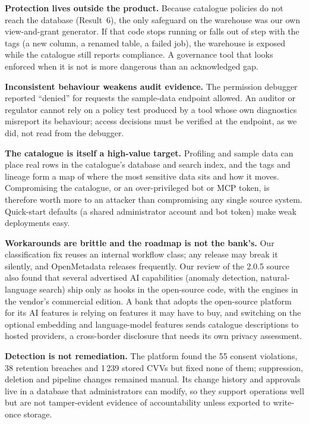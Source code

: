 \documentclass[journal,onecolumn,11pt]{IEEEtran}
\begin{document}
\textbf{Protection lives outside the product.} Because catalogue policies do not reach the database (Result~6), the only safeguard on the warehouse was our own view-and-grant generator. If that code stops running or falls out of step with the tags (a new column, a renamed table, a failed job), the warehouse is exposed while the catalogue still reports compliance. A governance tool that looks enforced when it is not is more dangerous than an acknowledged gap.

\textbf{Inconsistent behaviour weakens audit evidence.} The permission debugger reported ``denied'' for requests the sample-data endpoint allowed. An auditor or regulator cannot rely on a policy test produced by a tool whose own diagnostics misreport its behaviour; access decisions must be verified at the endpoint, as we did, not read from the debugger.

\textbf{The catalogue is itself a high-value target.} Profiling and sample data can place real rows in the catalogue's database and search index, and the tags and lineage form a map of where the most sensitive data sits and how it moves. Compromising the catalogue, or an over-privileged bot or MCP token, is therefore worth more to an attacker than compromising any single source system. Quick-start defaults (a shared administrator account and bot token) make weak deployments easy.

\textbf{Workarounds are brittle and the roadmap is not the bank's.} Our classification fix reuses an internal workflow class; any release may break it silently, and OpenMetadata releases frequently. Our review of the 2.0.5 source also found that several advertised AI capabilities (anomaly detection, natural-language search) ship only as hooks in the open-source code, with the engines in the vendor's commercial edition. A bank that adopts the open-source platform for its AI features is relying on features it may have to buy, and switching on the optional embedding and language-model features sends catalogue descriptions to hosted providers, a cross-border disclosure that needs its own privacy assessment.

\textbf{Detection is not remediation.} The platform found the 55 consent violations, 38 retention breaches and 1\,239 stored CVVs but fixed none of them; suppression, deletion and pipeline changes remained manual. Its change history and approvals live in a database that administrators can modify, so they support operations well but are not tamper-evident evidence of accountability unless exported to write-once storage.
\end{document}
